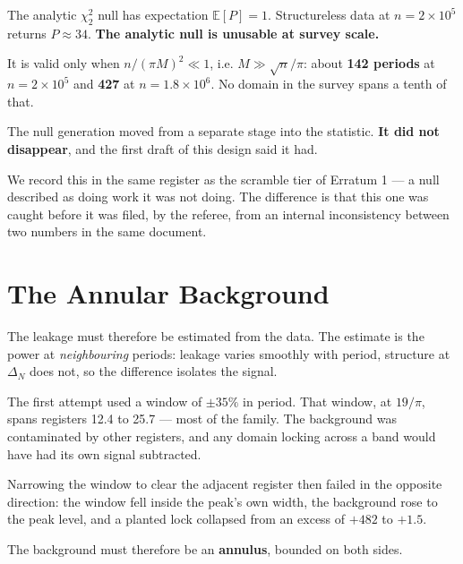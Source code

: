 \documentclass[11pt, letterpaper, openany]{book}
\begin{document}
\begin{warningbox}
The analytic $\chi^2_2$ null has expectation $\mathbb{E}[P] = 1$. Structureless data at
$n = 2\times10^5$ returns $P \approx 34$. \textbf{The analytic null is unusable at survey
scale.}

\medskip
\noindent It is valid only when $n/(\pi M)^2 \ll 1$, i.e. $M \gg \sqrt{n}/\pi$: about
\textbf{142 periods} at $n = 2\times10^5$ and \textbf{427} at $n = 1.8\times10^6$. No domain in
the survey spans a tenth of that.

\medskip
\noindent The null generation moved from a separate stage into the statistic. \textbf{It did not
disappear}, and the first draft of this design said it had.
\end{warningbox}

We record this in the same register as the scramble tier of Erratum 1 --- a null described as
doing work it was not doing. The difference is that this one was caught before it was filed,
by the referee, from an internal inconsistency between two numbers in the same document.

\section{The Annular Background}

The leakage must therefore be estimated from the data. The estimate is the power at
\emph{neighbouring} periods: leakage varies smoothly with period, structure at $\Delta_N$ does
not, so the difference isolates the signal.

The first attempt used a window of $\pm 35\%$ in period. That window, at $19/\pi$, spans
registers 12.4 to 25.7 --- most of the family. The background was contaminated by other
registers, and any domain locking across a band would have had its own signal subtracted.

Narrowing the window to clear the adjacent register then failed in the opposite direction: the
window fell inside the peak's own width, the background rose to the peak level, and a planted
lock collapsed from an excess of $+482$ to $+1.5$.

The background must therefore be an \textbf{annulus}, bounded on both sides.
\end{document}
